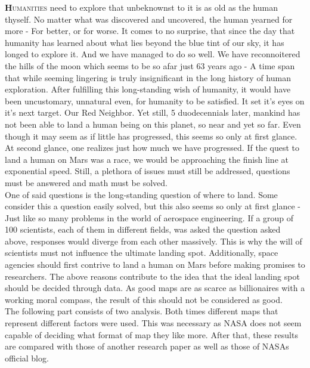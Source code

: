 \documentclass{article}
\begin{document}
\begin{multicols}{3}%

\noindent
\lettrine[lraise=0.1, nindent=0em, slope=-.5em]{\textbf{H}}{umanities} need
to explore that unbeknownst to it is as old as
the human thyself. 
\noindent
No matter what was discovered and uncovered, the human yearned for more - For better, or for worse. 
It comes to no surprise, that since the day that humanity has learned about what lies beyond
the blue tint of our sky, it has longed to
explore it.
And we have managed to do so well.
We have reconnoitered the hills of the moon
which seems to be so afar just 63 years ago - A time span that while seeming lingering is truly insignificant in the long history of human exploration.
After fulfilling this long-standing wish of humanity, it
would have been uncustomary, unnatural even, for humanity to be satisfied.
It set it's eyes on it's next target. Our Red Neighbor.
Yet still, 5 duodecennials later, mankind has not been able to land a human being on this planet, so near and yet so far.
Even though it may seem as if little has progressed, this seems so only at first glance.
At second glance, one realizes just how much we have progressed.
If the quest to land a human on Mars was a race, we would be approaching the finish line at exponential speed.
Still, a plethora of issues must still be addressed, questions must be answered and math must be solved. %
\\ %
One of said questions is the long-standing question of where to land.
Some consider this a question easily solved, but this also seems so only at first glance - Just like so many problems in the world of aerospace engineering.
If a group of 100 scientists, each of them in different fields, was asked the question asked above, responses would diverge from each other massively. 
This is why the will of scientists must not influence the ultimate landing spot.
Additionally, space agencies should first contrive to land a human on Mars before making promises to researchers.
The above reasons contribute to the idea that the ideal landing spot should be decided through data.
As good maps are as scarce as billionaires with a working moral compass, the result of this should not be considered as good.
\\
The following part consists of two analysis. Both times different maps that represent different factors were used.
This was necessary as NASA does not seem capable of deciding what format of map they like more.
After that, these results are compared with those of another research paper as well as those of NASAs official blog.


\end{multicols}
\end{document}
